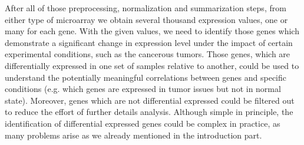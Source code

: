 After all of those preprocessing, normalization and summarization steps, from either type of microarray we obtain several thousand expression values, one or many for each gene.
With the given values, we need to identify those genes which demonstrate a significant change in expression level under the impact of certain experimental conditions, such as the cancerous tumors. Those genes, which are differentially expressed in one set of samples relative to another, could be used to understand the potentially meaningful correlations between genes and specific conditions (e.g. which genes are expressed in tumor issues but not in normal state). Moreover, genes which are not differential expressed could be filtered out to reduce the effort of further details analysis. Although simple in principle, the identification of differential expressed genes could be complex in practice, as many problems arise as we already mentioned in the introduction part.
